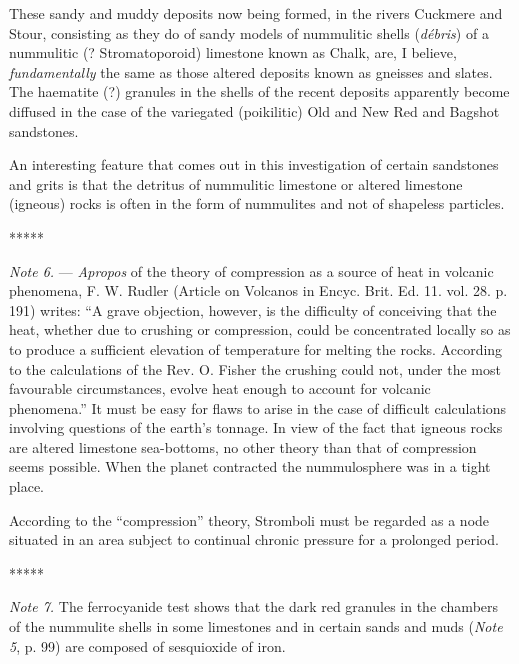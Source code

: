 \documentclass[a4paper, 12pt, oneside]{article}
\begin{document}
These sandy and muddy deposits now being formed, in the rivers Cuckmere and Stour, consisting as they do of sandy models of nummulitic shells (\emph{débris}) of a nummulitic (? Stromatoporoid) limestone known as Chalk, are, I believe, \emph{fundamentally} the same as those altered deposits known as gneisses and slates. The haematite (?) granules in the shells of the recent deposits apparently become diffused in the case of the variegated (poikilitic) Old and New Red and Bagshot sandstones.

An interesting feature that comes out in this investigation of certain sandstones and grits is that the detritus of nummulitic limestone or altered limestone (igneous) rocks is often in the form of nummulites and not of shapeless particles.

\centerline{*\hspace{15mm}*\hspace{15mm}*\hspace{15mm}*\hspace{15mm}*}
\bigskip

\emph{Note 6.} --- \emph{Apropos} of the theory of compression as a source of heat in volcanic phenomena, F. W. Rudler (Article on Volcanos in Encyc. Brit. Ed. 11. vol. 28. p. 191) writes: ``A grave objection, however, is the difficulty of conceiving that the heat, whether due to crushing or compression, could be concentrated locally so as to produce a sufficient elevation of temperature for melting the rocks. According to the calculations of the Rev. O. Fisher the crushing could not, under the most favourable circumstances, evolve heat enough to account for volcanic phenomena.'' It must be easy for flaws to arise in the case of difficult calculations involving questions of the earth's tonnage. In view of the fact that igneous rocks are altered limestone sea-bottoms, no other theory than that of compression seems possible. When the planet contracted the nummulosphere was in a tight place.

According to the ``compression'' theory, Stromboli must be regarded as a node situated in an area subject to continual chronic pressure for a prolonged period.

\centerline{*\hspace{15mm}*\hspace{15mm}*\hspace{15mm}*\hspace{15mm}*}
\bigskip

\emph{Note 7.} The ferrocyanide test shows that the dark red granules in the chambers of the nummulite shells in some limestones and in certain sands and muds (\emph{Note 5}, p. 99) are composed of sesquioxide of iron.
\end{document}
